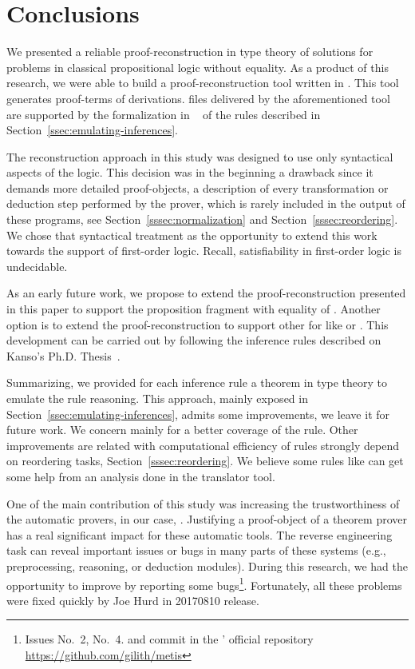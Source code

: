 \documentclass[../main.tex]{subfiles}
\begin{document}

\section{Conclusions}
\label{sec:conclusions}

We presented a reliable proof-reconstruction in type theory of \Metis
solutions for problems in classical propositional logic without
equality. As a product of this research, we were able to build a proof-reconstruction tool written in \Haskell. This tool generates
\Agda proof-terms of \Metis \TSTP derivations. \Agda files
delivered by the aforementioned tool are supported by the
formalization in \Agda~\cite{AgdaProp,AgdaMetis} of the \Metis rules
described in Section~\ref{ssec:emulating-inferences}.

The reconstruction approach in this study was designed to use
only syntactical aspects of the logic.
This decision was in the beginning a drawback
since it demands more detailed proof-objects, a
description of every transformation or deduction step performed by
the prover, which is rarely included in the output of these programs,
see Section~\ref{sssec:normalization} and Section~\ref{sssec:reordering}.
We chose that syntactical treatment as the opportunity
to extend this work towards the support of first-order logic.
Recall, satisfiability in first-order logic is undecidable.

As an early future work, we propose to extend the
proof-reconstruction presented in this paper to support the
proposition fragment with equality of \Metis.
Another option is to extend the proof-reconstruction to support other \ATPs for \CPL like  or .
This development can be carried out by following the 
inference rules described on Kanso's Ph.D. Thesis~\cite{Kanso2012}.

Summarizing, we provided for each \Metis inference rule a theorem in
type theory to emulate the rule reasoning. This approach, mainly
exposed in Section~\ref{ssec:emulating-inferences},
admits some improvements, we leave it for future work. We concern
mainly for a better coverage of the \simplify rule.
Other improvements are related with computational efficiency of
rules strongly depend on reordering tasks,
Section~\ref{sssec:reordering}.
We believe some rules like \canonicalize can get some help from an analysis done in the translator tool.

One of the main contribution of this study was
increasing the trustworthiness of the automatic provers,
in our case, \Metis.
Justifying a proof-object of a theorem prover
has a real significant impact for these automatic tools.
The reverse engineering task can reveal important issues or bugs
in many parts of these systems (e.g., preprocessing, reasoning, or
deduction modules). During this research, we had the opportunity
to improve \Metis by reporting some bugs\footnote{Issues No.~2,
No.~4. and commit  in the \Metis' official repository
\url{https://github.com/gilith/metis}}.
Fortunately, all these problems were fixed quickly by Joe Hurd in
20170810 release.
\end{document}

